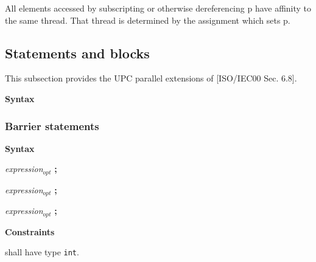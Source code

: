    All elements accessed by subscripting or otherwise dereferencing
   p have affinity to the same thread.  That thread is determined by
   the assignment which sets p.

\subsection{Statements and blocks}

\npf This subsection provides the UPC parallel extensions of
    [ISO/IEC00 Sec. 6.8].

{\bf Syntax} 


\hspace{3em}{\em labeled-statement}

\hspace{3em}{\em compound-statement}

\hspace{3em}{\em expression-statement}

\hspace{3em}{\em selection-statement}

\hspace{3em}{\em iteration-statement}

\hspace{3em}{\em jump-statement}

\hspace{3em}{\em synchronization-statement}

\subsubsection{Barrier statements}
\label{upc_barrier}

{\bf Syntax} 


\hspace{3em}{\bf upc\_notify} {\em expression$_{opt}$} {\bf ;}

\hspace{3em}{\bf upc\_wait} {\em expression$_{opt}$} {\bf ;}

\hspace{3em}{\bf upc\_barrier} {\em expression$_{opt}$} {\bf ;}

\hspace{3em}{\bf upc\_fence ;}

{\bf Constraints} 

 shall have type {\tt int}. 


